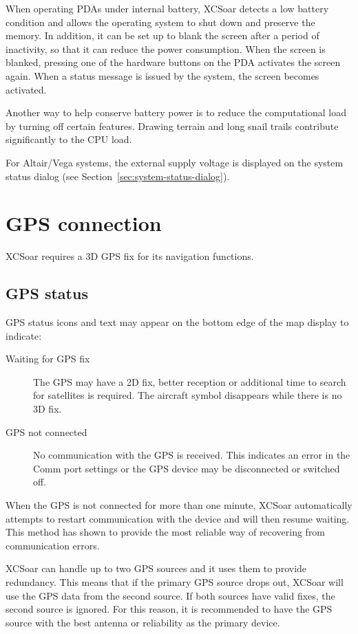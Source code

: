 \documentclass[a4paper,12pt]{refrep}
\begin{document}
When operating PDAs under internal battery, XCSoar detects a low
battery condition and allows the operating system to shut down and
preserve the memory.  In addition, it can be set up to blank the
screen after a period of inactivity, so that it can reduce the power
consumption.  When the screen is blanked, pressing one of the hardware
buttons on the PDA activates the screen again.  When a status message
is issued by the system, the screen becomes activated.

Another way to help conserve battery power is to reduce the
computational load by turning off certain features.  Drawing terrain
and long snail trails contribute significantly to the CPU load.

For Altair/Vega systems, the external supply voltage is displayed on
the system status dialog (see Section~\ref{sec:system-status-dialog}).

\section{GPS connection}

XCSoar requires a 3D GPS fix for its navigation functions.

\subsection*{GPS status}

GPS status icons and text may appear on the bottom edge of the
map display to indicate:
\begin{description}
\item[Waiting for GPS fix]  The GPS may have a 2D fix, better reception
  or additional time to search for satellites is required.
  The aircraft symbol disappears while there is no 3D fix.
\item[GPS not connected]  No communication with the GPS is received.
  This indicates an error in the Comm port settings or the GPS device may
  be disconnected or switched off.
\end{description}

When the GPS is not connected for more than one minute, XCSoar
automatically attempts to restart communication with the device and
will then resume waiting.  This method has shown to provide the most
reliable way of recovering from communication errors.

XCSoar can handle up to two GPS sources and it uses them to provide
redundancy.  This means that if the primary GPS source drops out,
XCSoar will use the GPS data from the second source.  If both sources
have valid fixes, the second source is ignored.  For this reason, it
is recommended to have the GPS source with the best antenna or
reliability as the primary device.
\end{document}
